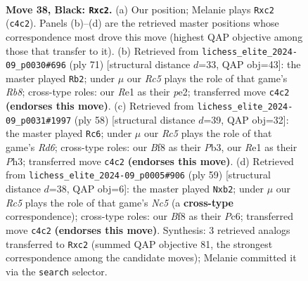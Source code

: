 \documentclass[11pt]{article}
\begin{document}
\clearpage

\begin{figure}[p]\centering
\begin{subfigure}{0.46\textwidth}\centering
\resizebox{\linewidth}{!}{%
\newchessgame
\chessboard[
  setfen={5b2/pp5k/6p1/1N3p1p/P1r5/6P1/RPP2PKP/4r3 b - - 3 38},
  showmover=false,
  pgfstyle=straightmove, color=movearrow, markmove={c4-c2}
]}
\caption{}
\end{subfigure}\hfill
\begin{subfigure}{0.46\textwidth}\centering
\resizebox{\linewidth}{!}{%
\newchessgame
\chessboard[
  setfen={6k1/5p2/2N3p1/p1b4p/2P5/1P1R2P1/4P1KP/1r6 b - - 3 36},
  showmover=false,
  pgfstyle=straightmove, color=movearrow, markmove={b1-b2}
]}
\caption{}
\end{subfigure}
\\[4pt]
\begin{subfigure}{0.46\textwidth}\centering
\resizebox{\linewidth}{!}{%
\newchessgame
\chessboard[
  setfen={8/1r3ppk/1p1Rp2p/p7/P1P5/1P5P/5PP1/6K1 w - - 2 30},
  showmover=false,
  pgfstyle=straightmove, color=movearrow, markmove={d6-c6}
]}
\caption{}
\end{subfigure}\hfill
\begin{subfigure}{0.46\textwidth}\centering
\resizebox{\linewidth}{!}{%
\newchessgame
\chessboard[
  setfen={6k1/5p2/2p3pp/8/2n5/P1Nr3P/1PR2PP1/6K1 b - - 3 30},
  showmover=false,
  pgfstyle=straightmove, color=movearrow, markmove={c4-b2}
]}
\caption{}
\end{subfigure}
\caption{\textbf{Move 38, Black: \texttt{Rxc2}.} (a) Our position; Melanie plays \texttt{Rxc2} (\texttt{c4c2}). Panels (b)--(d) are the retrieved master positions whose correspondence most drove this move (highest QAP objective among those that transfer to it). (b) Retrieved from \texttt{lichess\_elite\_2024-09\_p0030\#696} (ply 71) [structural distance $d$=33, QAP obj=43]: the master played \texttt{Rb2}; under $\mu$ our \emph{Rc5} plays the role of that game's \emph{Rb8}; cross-type roles: our \emph{R}e1 as their \emph{p}e2; transferred move \texttt{c4c2} \textbf{(endorses this move)}. (c) Retrieved from \texttt{lichess\_elite\_2024-09\_p0031\#1997} (ply 58) [structural distance $d$=39, QAP obj=32]: the master played \texttt{Rc6}; under $\mu$ our \emph{Rc5} plays the role of that game's \emph{Rd6}; cross-type roles: our \emph{B}f8 as their \emph{P}b3, our \emph{R}e1 as their \emph{P}h3; transferred move \texttt{c4c2} \textbf{(endorses this move)}. (d) Retrieved from \texttt{lichess\_elite\_2024-09\_p0005\#906} (ply 59) [structural distance $d$=38, QAP obj=6]: the master played \texttt{Nxb2}; under $\mu$ our \emph{Rc5} plays the role of that game's \emph{Nc5} (a \textbf{cross-type} correspondence); cross-type roles: our \emph{B}f8 as their \emph{P}c6; transferred move \texttt{c4c2} \textbf{(endorses this move)}. Synthesis: 3 retrieved analogs transferred to \texttt{Rxc2} (summed QAP objective 81, the strongest correspondence among the candidate moves); Melanie committed it via the \texttt{search} selector.}
\label{fig:thought-m75}
\end{figure}
\end{document}
